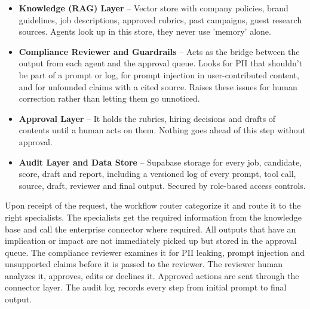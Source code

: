 \begin{itemize}
  \item \textbf{Knowledge (RAG) Layer} -- Vector store with company policies, brand guidelines, job descriptions, approved rubrics, past campaigns, guest research sources. Agents look up in this store, they never use 'memory' alone.
  \item \textbf{Compliance Reviewer and Guardrails} -- Acts as the bridge between the output from each agent and the approval queue. Looks for PII that shouldn't be part of a prompt or log, for prompt injection in user-contributed content, and for unfounded claims with a cited source. Raises these issues for human correction rather than letting them go unnoticed.
  \item \textbf{Approval Layer} -- It holds the rubrics, hiring decisions and drafts of contents until a human acts on them. Nothing goes ahead of this step without approval.
  \item \textbf{Audit Layer and Data Store} -- Supabase storage for every job, candidate, score, draft and report, including a versioned log of every prompt, tool call, source, draft, reviewer and final output. Secured by role-based access controls.
\end{itemize}

\vspace{12pt}
Upon receipt of the request, the workflow router categorize it and route it to the right specialists. The specialists get the required information from the knowledge base and call the enterprise connector where required. All outputs that have an implication or impact are not immediately picked up but stored in the approval queue. The compliance reviewer examines it for PII leaking, prompt injection and unsupported claims before it is passed to the reviewer. The reviewer human analyzes it, approves, edits or declines it. Approved actions are sent through the connector layer. The audit log records every step from initial prompt to final output.